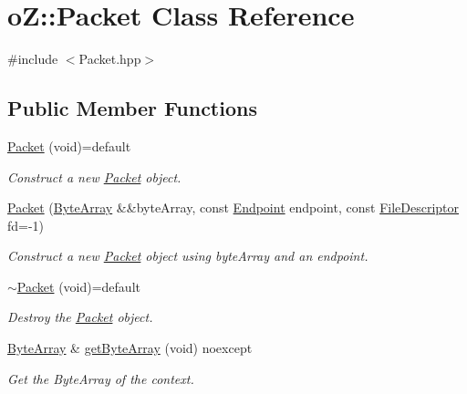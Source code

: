 \hypertarget{classo_z_1_1_packet}{}\section{oZ\+::Packet Class Reference}
\label{classo_z_1_1_packet}


{\ttfamily \#include $<$Packet.\+hpp$>$}

\subsection*{Public Member Functions}
\begin{DoxyCompactItemize}
\item 
\mbox{\hyperlink{classo_z_1_1_packet_a5c96f8d5db686e035b199e8aeb0e0cea}{Packet}} (void)=default
\begin{DoxyCompactList}\small\item\em Construct a new \mbox{\hyperlink{classo_z_1_1_packet}{Packet}} object. \end{DoxyCompactList}\item 
\mbox{\hyperlink{classo_z_1_1_packet_a4affbe387050c6b67f4604f9eaadc074}{Packet}} (\mbox{\hyperlink{namespaceo_z_abfa3f5a46e5c7584615dc1dd33fcafb6}{Byte\+Array}} \&\&byte\+Array, const \mbox{\hyperlink{classo_z_1_1_endpoint}{Endpoint}} endpoint, const \mbox{\hyperlink{namespaceo_z_acbb8d05709257b6414b3979597f88c0c}{File\+Descriptor}} fd=-\/1)
\begin{DoxyCompactList}\small\item\em Construct a new \mbox{\hyperlink{classo_z_1_1_packet}{Packet}} object using byte\+Array and an endpoint. \end{DoxyCompactList}\item 
\mbox{\hyperlink{classo_z_1_1_packet_a01d80a0c452b1e07dfd160f494be2af5}{$\sim$\+Packet}} (void)=default
\begin{DoxyCompactList}\small\item\em Destroy the \mbox{\hyperlink{classo_z_1_1_packet}{Packet}} object. \end{DoxyCompactList}\item 
\mbox{\hyperlink{namespaceo_z_abfa3f5a46e5c7584615dc1dd33fcafb6}{Byte\+Array}} \& \mbox{\hyperlink{classo_z_1_1_packet_a8a5d791e4675a3f065928884b64fe7bf}{get\+Byte\+Array}} (void) noexcept
\begin{DoxyCompactList}\small\item\em Get the Byte\+Array of the context. \end{DoxyCompactList}\item 

\end{DoxyCompactItemize}
